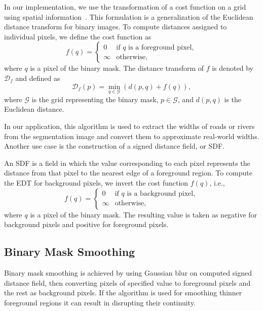 In our implementation, we use the transformation of a cost function on a grid using spatial information~\cite{bk_edt}. This formulation is a generalization of the Euclidean distance transform for binary images. To compute distances assigned to individual pixels, we define the cost function as
\begin{equation}
	f(q) =
	\begin{cases}
		0 & \text{if } q \text{ is a foreground pixel}, \\
		\infty & \text{otherwise},
	\end{cases}
\end{equation}
where $q$ is a pixel of the binary mask. The distance transform of $f$ is denoted by $\mathcal{D}_f$ and defined as
\begin{equation}
	\mathcal{D}_f(p) = \min_{q\in \mathcal{G}}\left(d(p,q) + f(q)\right),
\end{equation}
where $\mathcal{G}$ is the grid representing the binary mask, $p \in \mathcal{G}$, and $d(p,q)$ is the Euclidean distance.


In our application, this algorithm is used to extract the widths of roads or rivers from the segmentation image and convert them to approximate real-world widths. Another use case is the construction of a signed distance field, or SDF.

An SDF is a field in which the value corresponding to each pixel represents the distance from that pixel to the nearest edge of a foreground region. To compute the EDT for background pixels, we invert the cost function $f(q)$, i.e.,
\begin{equation}
	f(q) =
	\begin{cases}
		0 & \text{if } q \text{ is a background pixel}, \\
		\infty & \text{otherwise},
	\end{cases}
\end{equation}
where $q$ is a pixel of the binary mask. The resulting value is taken as negative for background pixels and positive for foreground pixels.


\subsection{Binary Mask Smoothing}

Binary mask smoothing is achieved by using Gaussian blur on computed signed distance field, then converting pixels of specified value to foreground pixels and the rest as background pixels. If the algorithm is used for smoothing thinner foreground regions it can result in disrupting their continuity. 


